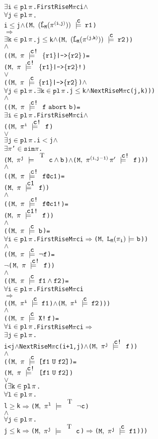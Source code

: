 \documentclass{llncs}
\makeatletter
\newcommand{\And}{\(\wedge\)}
\newcommand{\Or}{\(\vee\)}
\newcommand{\Imp}{\(\Rightarrow\)}
\newcommand{\Not}{\(\neg\)}
\newcommand{\Exists}{\(\exists\)}
\newcommand{\In}{\(\in\)}
\newcommand{\pathCat}[2]{#1\hspace*{0.5mm}#2}
\newcommand{\Leq}{\(\leq\)}
\newcommand{\Geq}{\(\geq\)}
\newcommand{\Le}{\(<\)}
\newcommand{\T}{\texttt{\small\rm{T}}}
\renewcommand{\Pi}{\(\pi\)}
\newcommand{\BSem}[3]{(\(\tt#1,~#2~{\models}~#3\))}
\newcommand{\SSem}[4]{(\(\tt{#1,~#2~\models^{\hspace*{-2.3mm}\raisebox{1mm}{\tt#3}}~#4}\))}
\newcommand{\FSem}[4]{(\(\tt{#1,~#2~\models^{\hspace*{-2.3mm}\raisebox{1mm}{\tt#3}}~#4}\))}
\newcommand{\pl}{\texttt{pl}\xspace}
\newcommand{\Sim}{\(\texttt{sim}\xspace\)}
\newcommand{\ResExists}[2]{\(\exists{\tt#1}\in\pl\hspace*{0.5mm}#2\)}
\newcommand{\ResForall}[2]{\(\forall{\tt#1}\in\pl\hspace*{0.5mm}#2\)}
\newcommand{\FBool}[1]{#1}
\newcommand{\bNot}[1]{\neg#1}
\newcommand{\fNot}[1]{\neg#1}
\newcommand{\weakClock}[1]{#1}
\newcommand{\strongClock}[1]{#1!}
\newcommand{\restN}[2]{#1^{#2}}
\newcommand{\pathEl}[2]{#1_{#2}}
\newcommand{\pathSeg}[2]{#1^{#2}}
\newcommand{\lHat}[1]{\hat{\texttt{L}}_{#1}}
\newcommand{\lNoHat}[1]{{\texttt{L}}_{#1}}
\newcommand{\bAnd}[2]{#1\wedge#2}
\newcommand{\fAnd}[2]{#1 \wedge #2}
\newcommand{\fNext}[1]{\texttt{X!}\hspace*{0.8mm}#1}
\newcommand{\fUntil}[2]{\texttt{[}#1~\texttt{U}~#2\texttt{]}}
\newcommand{\fStrongImp}[2]{\{#1\}\texttt{|->}\{#2\}\texttt{!}}
\newcommand{\fWeakImp}[2]{\{#1\}\texttt{|->}\{#2\}}
\newcommand{\fAbort}[2]{#1~\texttt{abort}~#2}
\newcommand{\fWeakClock}[2]{#1\texttt{@}#2}
\newcommand{\fStrongClock}[2]{#1\texttt{@}#2\texttt{!}}
\makeatother
\begin{document}
{\begin{alltt}
      {\ResExists{i}{\pi}}. FirstRise M {\Pi} c i {\And} 
                {\ResForall{j}{\pi}}. 
                     i \Leq j \And \SSem{M}{(\lHat{M} (\pathSeg{\pi}{(i,j)}))}{c}{r1}
                     {\Imp}
                     {\ResExists{k}{\pi}}. j \Leq k \And \SSem{M}{(\lHat{M} (\pathSeg{\pi}{(j,k)}))}{c}{r2})
    {\And}
    ({\FSem{M}{{\pi}}{{\strongClock{c}}}{\fWeakImp{r1}{r2}}} = 
     {\FSem{M}{{\pi}}{{\strongClock{c}}}{\fStrongImp{r1}{r2}}}
     {\Or}
     ({\FSem{M}{{\pi}}{{\weakClock{c}}}{\fWeakImp{r1}{r2}}} {\And}
       {\ResForall{j}{\pi}}. {\ResExists{k}{\pi}}. j {\Leq} k \And NextRise M {\Pi} c (j,k)))
    {\And}
    ({\FSem{M}{{\pi}}{{\strongClock{c}}}{\fAbort{f}{b}}} =
      {\ResExists{i}{\pi}}. FirstRise M {\Pi} c i {\And}
                ({\FSem{M}{\restN{{\pi}}{i}}{{\strongClock{c}}}{f }}
                 {\Or}
                 {\ResExists{j}{\pi}}. i \Le j \And 
                   \Exists{\Pi}'\In\Sim {\Pi}. 
                    {\FSem{M}{\restN{{\pi}}{j}}{\weakClock{\T}}{{\FBool{\bAnd{c}{b}}}}} {\And} {\FSem{M}{\pathCat{\pathSeg{\pi}{(i,j-1)}}{{\pi}'}}{{\strongClock{c}}}{f}}))
    {\And}
    ({\FSem{M}{{\pi}}{{\strongClock{c}}}{\fWeakClock{f}{c1}}} =   
      {\FSem{M}{{\pi}}{{\weakClock{c1}}}{f)}}
    {\And}
    ({\FSem{M}{{\pi}}{{\strongClock{c}}}{\fStrongClock{f}{c1}}} =   
      {\FSem{M}{{\pi}}{{\strongClock{c1}}}{f}})
    {\And}
    ({\FSem{M}{{\pi}}{{\weakClock{c}}}{{\FBool{b}}}} = 
      {\ResForall{i}{\pi}}. FirstRise M {\Pi} c i {\Imp} {\BSem{M}{\lNoHat{M}(\pathEl{{\pi}}{i})}{b}})
    {\And}
    ({\FSem{M}{{\pi}}{{\weakClock{c}}}{\fNot{f}}} = 
      {\Not}{\FSem{M}{{\pi}}{{\strongClock{c}}}{f}}) 
    {\And}
    ({\FSem{M}{{\pi}}{{\weakClock{c}}}{\fAnd{f1}{f2}}} = 
       {\ResForall{i}{\pi}}. FirstRise M {\Pi} c i
                 {\Imp}
                 ({\FSem{M}{\restN{{\pi}}{i}}{{\weakClock{c}}}{f1}} {\And} {\FSem{M}{\restN{{\pi}}{i}}{{\weakClock{c}}}{f2}}))
    {\And}
    ({\FSem{M}{{\pi}}{{\weakClock{c}}}{\fNext{f}}} = 
      {\ResForall{i}{\pi}}. FirstRise M {\Pi} c i {\Imp} 
                \ResExists{j}{\pi}. 
                  i < j \And NextRise M {\Pi} c (i+1,j) \And {\FSem{M}{\restN{{\pi}}{j}}{{\strongClock{c}}}{f}})
    {\And}
    ({\FSem{M}{{\pi}}{{\weakClock{c}}}{\fUntil{f1}{f2}}} = 
      {\FSem{M}{{\pi}}{{\strongClock{c}}}{\fUntil{f1}{f2}}}  
       {\Or}
      ({\ResExists{k}{\pi}}.
        {\ResForall{l}{\pi}}.
          l {\Geq} k {\Imp} {\FSem{M}{\restN{{\pi}}{l}}{\weakClock{\T}}{{\FBool{\bNot{c}}}}}
                    {\And} 
                    {\ResForall{j}{\pi}}. 
                      j {\Leq} k {\Imp} {\FSem{M}{\restN{{\pi}}{j}}{\weakClock{\T}}{{\FBool{c}}}} {\Imp} {\FSem{M}{\restN{{\pi}}{j}}{{\weakClock{c}}}{f1}}))

\end{alltt}}
\end{document}
